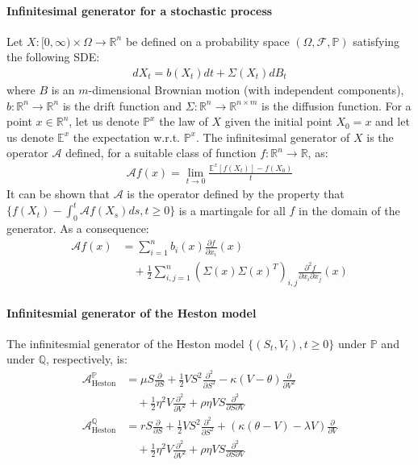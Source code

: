 \documentclass[a4paper,landscape,7pt,fleqn]{scrartcl}
\begin{document}
\begin{multicols*}{3}
\paragraph{Infinitesimal generator for a stochastic process}
Let $X: [0,\infty) \times \Omega \rightarrow \mathbb{R}^n$ be defined on a probability space $(\Omega, \mathcal{F}, \mathbb{P})$ satisfying the following SDE:
\begin{align*}
dX_t = b(X_t) dt + \Sigma (X_t) dB_t
\end{align*}
where $B$ is an $m$-dimensional Brownian motion (with independent components), $b: \mathbb{R}^n \rightarrow \mathbb{R}^n$ is the drift function and $\Sigma : \mathbb{R}^n \rightarrow \mathbb{R}^{n \times m}$ is the diffusion function. For a point $x \in \mathbb{R}^n$, let us denote $\mathbb{P}^x$ the law of $X$ given the initial point $X_0 = x$ and let us denote $\mathbb{E}^x$ the expectation w.r.t. $\mathbb{P}^x$. The infinitesimal generator of $X$ is the operator $\mathcal{A}$ defined, for a suitable class of function $f: \mathbb{R}^n \rightarrow \mathbb{R}$, as:
\begin{align*}
\mathcal{A} f(x) = \lim\limits_{t \rightarrow 0} \frac{\mathbb{E}^x[f(X_t)] - f(X_0)}{t}
\end{align*}
It can be shown that $\mathcal{A}$ is the operator defined by the property that $\{ f(X_t) - \int_0^t \mathcal{A} f(X_s) ds, t \geq 0 \}$ is a martingale for all $f$ in the domain of the generator. As a consequence:
\begin{align*}
\mathcal{A} f(x) &= \sum_{i=1}^n b_i(x) \frac{\partial f}{\partial x_i}(x) \\
& \quad + \frac{1}{2} \sum_{i,j=1}^n (\Sigma(x) \Sigma(x)^T)_{i,j} \frac{\partial^2 f}{\partial x_i \partial x_j}(x)
\end{align*}

\paragraph{Infinitesmial generator of the Heston model}
The infinitesmial generator of the Heston model $\{ (S_t,V_t), t \geq 0 \}$ under $\mathbb{P}$ and under $\mathbb{Q}$, respectively, is:
\begin{align*}
\mathcal{A}_\text{Heston}^\mathbb{P} &= \mu S \frac{\partial}{\partial S} + \frac{1}{2} V S^2 \frac{\partial^2}{\partial S^2} - \kappa (V-\theta) \frac{\partial}{\partial V^2} \\
& \quad + \frac{1}{2} \eta^2 V \frac{\partial^2}{\partial V^2} + \rho \eta V S \frac{\partial^2}{\partial S \partial V} \\
\mathcal{A}_\text{Heston}^\mathbb{Q} &= r S \frac{\partial}{\partial S} + \frac{1}{2} V S^2 \frac{\partial^2}{\partial S^2} + (\kappa(\theta - V) - \lambda V) \frac{\partial}{\partial V} \\
& \quad + \frac{1}{2} \eta^2 V \frac{\partial^2}{\partial V^2} + \rho \eta V S \frac{\partial^2}{\partial S \partial V}
\end{align*}


\end{multicols*}
\end{document}
